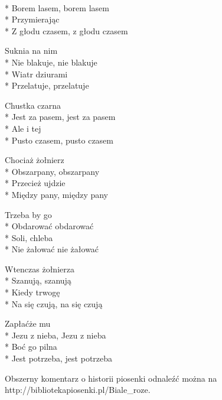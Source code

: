 \begin{lyrics}[longestline={Z głodu czasem, z głodu czasem}]

\\*
Borem lasem, borem lasem\\*
Przymierając\\*
Z głodu czasem, z głodu czasem

Suknia na nim\\*
Nie blakuje, nie blakuje\\*
Wiatr dziurami\\*
Przelatuje, przelatuje

Chustka czarna\\*
Jest za pasem, jest za pasem\\*
Ale i tej\\*
Pusto czasem, pusto czasem

Chociaż żołnierz\\*
Obszarpany, obszarpany\\*
Przecież ujdzie\\*
Między pany, między pany

Trzeba by go\\*
Obdarować obdarować\\*
Soli, chleba\\*
Nie żałować nie żałować

Wtenczas żołnierza\\*
Szanują, szanują\\*
Kiedy trwogę\\*
Na się czują, na się czują

Zapłaćże mu\\*
Jezu z nieba, Jezu z nieba\\*
Boć go pilna\\*
Jest potrzeba, jest potrzeba
\end{lyrics}



\begin{info}Obszerny komentarz o historii piosenki odnaleźć można na http://bibliotekapiosenki.pl/Biale_roze.\end{info}

